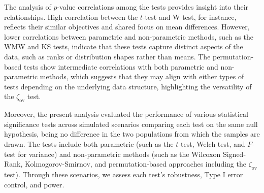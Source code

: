 \documentclass[twocolumn]{article}\usepackage[]{graphicx}\usepackage[]{xcolor}
\begin{document}
% 
% 

The analysis of $p$-value correlations among the tests provides insight into their relationships. High correlation between the $t$-test and W test, for instance, reflects their similar objectives and shared focus on mean differences. However, lower correlations between parametric and non-parametric methods, such as the WMW and KS tests, indicate that these tests capture distinct aspects of the data, such as ranks or distribution shapes rather than means. The permutation-based tests show intermediate correlations with both parametric and non-parametric methods, which suggests that they may align with either types of tests depending on the underlying data structure, highlighting the versatility of the $\zeta_{\mbox{ov}}$ test.


Moreover, the present analysis evaluated the performance of various statistical significance tests across simulated scenarios comparing each test on the same null hypothesis, being no difference in the two populations from which the samples are drawn. The tests include both parametric (such as the $t$-test, Welch test, and $F$-test for variance) and non-parametric methods (such as the Wilcoxon Signed-Rank, Kolmogorov-Smirnov, and permutation-based approaches including the $\zeta_{\mbox{ov}}$ test). Through these scenarios, we assess each test's robustness, Type I error control, and power.
\end{document}

